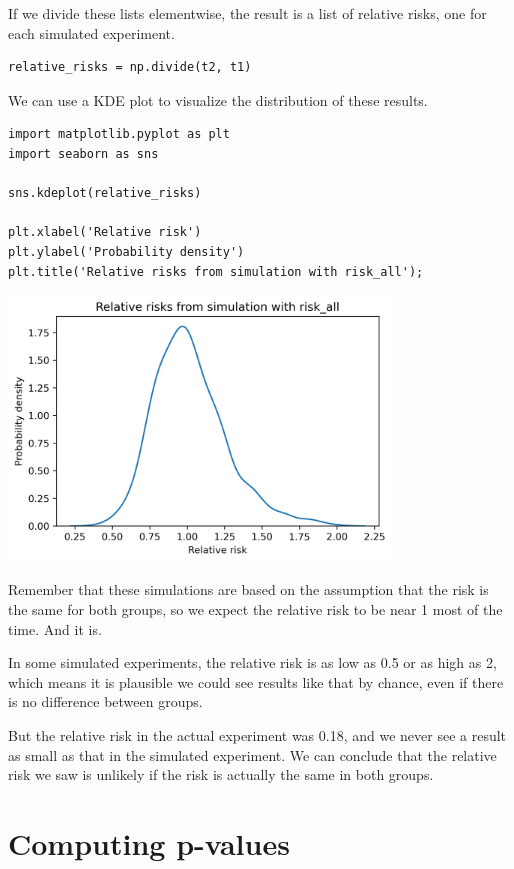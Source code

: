 If we divide these lists elementwise, the result is a list of relative
risks, one for each simulated experiment.

\begin{lstlisting}[]
relative_risks = np.divide(t2, t1)
\end{lstlisting}

We can use a KDE plot to visualize the distribution of these results.

\begin{lstlisting}[]
import matplotlib.pyplot as plt
import seaborn as sns

sns.kdeplot(relative_risks)

plt.xlabel('Relative risk')
plt.ylabel('Probability density')
plt.title('Relative risks from simulation with risk_all');
\end{lstlisting}

\begin{center}
\includegraphics[width=4in]{chapters/13_hypothesis_files/13_hypothesis_27_0.png}
\end{center}

Remember that these simulations are based on the assumption that the
risk is the same for both groups, so we expect the relative risk to be
near 1 most of the time. And it is.

In some simulated experiments, the relative risk is as low as 0.5 or as
high as 2, which means it is plausible we could see results like that by
chance, even if there is no difference between groups.

But the relative risk in the actual experiment was 0.18, and we never
see a result as small as that in the simulated experiment. We can
conclude that the relative risk we saw is unlikely if the risk is
actually the same in both groups.

\hypertarget{computing-p-values}{%
\section{Computing p-values}\label{computing-p-values}}

